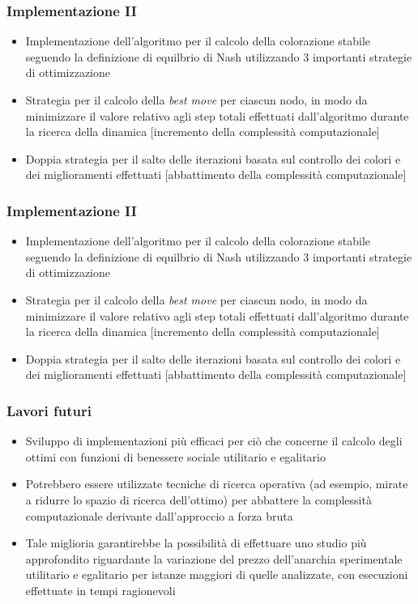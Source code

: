 \documentclass{beamer}
\begin{document}
\begin{frame}
\frametitle{Implementazione II}
\begin{itemize}
	\item Implementazione dell'\alert{algoritmo per il calcolo della colorazione stabile} seguendo la definizione di equilbrio di Nash utilizzando 3 importanti strategie di ottimizzazione
	\item Strategia per il calcolo della \textit{\alert{best move}} per ciascun nodo, in modo da minimizzare il valore relativo agli step totali effettuati dall'algoritmo durante la ricerca della dinamica [incremento della complessità computazionale]
	\item Doppia strategia per il salto delle iterazioni basata sul controllo dei colori e dei miglioramenti effettuati [abbattimento della complessità computazionale]
\end{itemize}
\end{frame}


\begin{frame}
\frametitle{Implementazione II}
\begin{itemize}
	\item Implementazione dell'\alert{algoritmo per il calcolo della colorazione stabile} seguendo la definizione di equilbrio di Nash utilizzando 3 importanti strategie di ottimizzazione
	\item Strategia per il calcolo della \textit{\alert{best move}} per ciascun nodo, in modo da minimizzare il valore relativo agli step totali effettuati dall'algoritmo durante la ricerca della dinamica [incremento della complessità computazionale]
	\item Doppia strategia per il salto delle iterazioni basata sul controllo dei colori e dei miglioramenti effettuati [abbattimento della complessità computazionale]
\end{itemize}
\end{frame}


\begin{frame}
\frametitle{Lavori futuri}
\begin{itemize}
	\item Sviluppo di implementazioni più efficaci per ciò che concerne il calcolo degli ottimi con funzioni di benessere sociale utilitario e egalitario
	\item Potrebbero essere utilizzate tecniche di ricerca operativa (ad esempio, mirate a ridurre lo spazio di ricerca dell'ottimo) per abbattere la complessità computazionale derivante dall'approccio a forza bruta
	\item Tale miglioria garantirebbe la possibilità di effettuare uno studio più approfondito riguardante la variazione del prezzo dell'anarchia sperimentale utilitario e egalitario per istanze maggiori di quelle analizzate, con esecuzioni effettuate in tempi ragionevoli
\end{itemize}
\end{frame}
\end{document}
